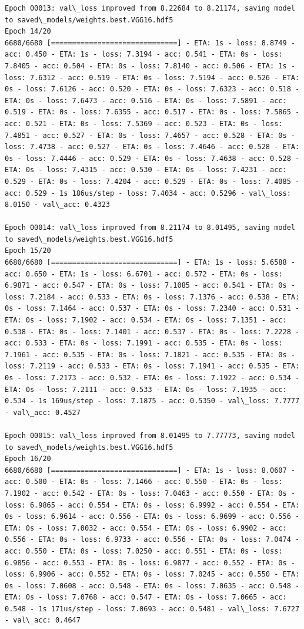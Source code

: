 \documentclass[11pt]{article}
\begin{document}
\begin{Verbatim}[commandchars=\\\{\}]
Epoch 00013: val\_loss improved from 8.22684 to 8.21174, saving model to saved\_models/weights.best.VGG16.hdf5
Epoch 14/20
6680/6680 [==============================] - ETA: 1s - loss: 8.8749 - acc: 0.450 - ETA: 1s - loss: 7.3194 - acc: 0.541 - ETA: 0s - loss: 7.8405 - acc: 0.504 - ETA: 0s - loss: 7.8140 - acc: 0.506 - ETA: 1s - loss: 7.6312 - acc: 0.519 - ETA: 0s - loss: 7.5194 - acc: 0.526 - ETA: 0s - loss: 7.6126 - acc: 0.520 - ETA: 0s - loss: 7.6323 - acc: 0.518 - ETA: 0s - loss: 7.6473 - acc: 0.516 - ETA: 0s - loss: 7.5891 - acc: 0.519 - ETA: 0s - loss: 7.6355 - acc: 0.517 - ETA: 0s - loss: 7.5865 - acc: 0.521 - ETA: 0s - loss: 7.5369 - acc: 0.523 - ETA: 0s - loss: 7.4851 - acc: 0.527 - ETA: 0s - loss: 7.4657 - acc: 0.528 - ETA: 0s - loss: 7.4738 - acc: 0.527 - ETA: 0s - loss: 7.4646 - acc: 0.528 - ETA: 0s - loss: 7.4446 - acc: 0.529 - ETA: 0s - loss: 7.4638 - acc: 0.528 - ETA: 0s - loss: 7.4315 - acc: 0.530 - ETA: 0s - loss: 7.4231 - acc: 0.529 - ETA: 0s - loss: 7.4204 - acc: 0.529 - ETA: 0s - loss: 7.4085 - acc: 0.529 - 1s 186us/step - loss: 7.4034 - acc: 0.5296 - val\_loss: 8.0150 - val\_acc: 0.4323

Epoch 00014: val\_loss improved from 8.21174 to 8.01495, saving model to saved\_models/weights.best.VGG16.hdf5
Epoch 15/20
6680/6680 [==============================] - ETA: 1s - loss: 5.6588 - acc: 0.650 - ETA: 1s - loss: 6.6701 - acc: 0.572 - ETA: 0s - loss: 6.9871 - acc: 0.547 - ETA: 0s - loss: 7.1085 - acc: 0.541 - ETA: 0s - loss: 7.2184 - acc: 0.533 - ETA: 0s - loss: 7.1376 - acc: 0.538 - ETA: 0s - loss: 7.1464 - acc: 0.537 - ETA: 0s - loss: 7.2340 - acc: 0.531 - ETA: 0s - loss: 7.1902 - acc: 0.534 - ETA: 0s - loss: 7.1351 - acc: 0.538 - ETA: 0s - loss: 7.1401 - acc: 0.537 - ETA: 0s - loss: 7.2228 - acc: 0.533 - ETA: 0s - loss: 7.1991 - acc: 0.535 - ETA: 0s - loss: 7.1961 - acc: 0.535 - ETA: 0s - loss: 7.1821 - acc: 0.535 - ETA: 0s - loss: 7.2119 - acc: 0.533 - ETA: 0s - loss: 7.1941 - acc: 0.535 - ETA: 0s - loss: 7.2173 - acc: 0.532 - ETA: 0s - loss: 7.1922 - acc: 0.534 - ETA: 0s - loss: 7.2111 - acc: 0.533 - ETA: 0s - loss: 7.1935 - acc: 0.534 - 1s 169us/step - loss: 7.1875 - acc: 0.5350 - val\_loss: 7.7777 - val\_acc: 0.4527

Epoch 00015: val\_loss improved from 8.01495 to 7.77773, saving model to saved\_models/weights.best.VGG16.hdf5
Epoch 16/20
6680/6680 [==============================] - ETA: 1s - loss: 8.0607 - acc: 0.500 - ETA: 0s - loss: 7.1466 - acc: 0.550 - ETA: 0s - loss: 7.1902 - acc: 0.542 - ETA: 0s - loss: 7.0463 - acc: 0.550 - ETA: 0s - loss: 6.9865 - acc: 0.554 - ETA: 0s - loss: 6.9992 - acc: 0.554 - ETA: 0s - loss: 6.9614 - acc: 0.556 - ETA: 0s - loss: 6.9699 - acc: 0.556 - ETA: 0s - loss: 7.0032 - acc: 0.554 - ETA: 0s - loss: 6.9902 - acc: 0.556 - ETA: 0s - loss: 6.9733 - acc: 0.556 - ETA: 0s - loss: 7.0474 - acc: 0.550 - ETA: 0s - loss: 7.0250 - acc: 0.551 - ETA: 0s - loss: 6.9856 - acc: 0.553 - ETA: 0s - loss: 6.9877 - acc: 0.552 - ETA: 0s - loss: 6.9906 - acc: 0.552 - ETA: 0s - loss: 7.0245 - acc: 0.550 - ETA: 0s - loss: 7.0608 - acc: 0.548 - ETA: 0s - loss: 7.0635 - acc: 0.548 - ETA: 0s - loss: 7.0768 - acc: 0.547 - ETA: 0s - loss: 7.0665 - acc: 0.548 - 1s 171us/step - loss: 7.0693 - acc: 0.5481 - val\_loss: 7.6727 - val\_acc: 0.4647


\end{Verbatim}
\end{document}
